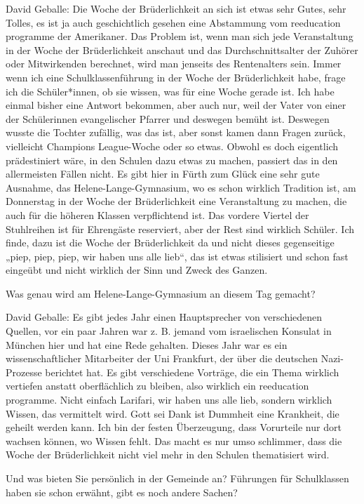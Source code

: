 David Geballe: Die Woche der Brüderlichkeit an sich ist etwas sehr Gutes, sehr Tolles, es ist ja auch geschichtlich gesehen eine Abstammung vom reeducation programme der Amerikaner. Das Problem ist, wenn man sich jede Veranstaltung in der Woche der Brüderlichkeit anschaut und das Durchschnittsalter der Zuhörer oder Mitwirkenden berechnet, wird man jenseits des Rentenalters sein. Immer wenn ich eine Schulklassenführung in der Woche der Brüderlichkeit habe, frage ich die Schüler*innen, ob sie wissen, was für eine Woche gerade ist. Ich habe einmal bisher eine Antwort bekommen, aber auch nur, weil der Vater von einer der Schülerinnen evangelischer Pfarrer und deswegen bemüht ist. Deswegen wusste die Tochter zufällig, was das ist, aber sonst kamen dann Fragen zurück, vielleicht Champions League-Woche oder so etwas. Obwohl es doch eigentlich prädestiniert wäre, in den Schulen dazu etwas zu machen, passiert das in den allermeisten Fällen nicht. Es gibt hier in Fürth zum Glück eine sehr gute Ausnahme, das Helene-Lange-Gymnasium, wo es schon wirklich Tradition ist, am Donnerstag in der Woche der Brüderlichkeit eine Veranstaltung zu machen, die auch für die höheren Klassen verpflichtend ist. Das vordere Viertel der Stuhlreihen ist für Ehrengäste reserviert, aber der Rest sind wirklich Schüler. Ich finde, dazu ist die Woche der Brüderlichkeit da und nicht dieses gegenseitige „piep, piep, piep, wir haben uns alle lieb“, das ist etwas stilisiert und schon fast eingeübt und nicht wirklich der Sinn und Zweck des Ganzen. 

Was genau wird am Helene-Lange-Gymnasium an diesem Tag gemacht? 

David Geballe: Es gibt jedes Jahr einen Hauptsprecher von verschiedenen Quellen, vor ein paar Jahren war z. B. jemand vom israelischen Konsulat in München hier und hat eine Rede gehalten. Dieses Jahr war es ein wissenschaftlicher Mitarbeiter der Uni Frankfurt, der über die deutschen Nazi-Prozesse berichtet hat. Es gibt verschiedene Vorträge, die ein Thema wirklich vertiefen anstatt oberflächlich zu bleiben, also wirklich ein reeducation programme. Nicht einfach Larifari, wir haben uns alle lieb, sondern wirklich Wissen, das vermittelt wird. Gott sei Dank ist Dummheit eine Krankheit, die geheilt werden kann. Ich bin der festen Überzeugung, dass Vorurteile nur dort wachsen können, wo Wissen fehlt. Das macht es nur umso schlimmer, dass die Woche der Brüderlichkeit nicht viel mehr in den Schulen thematisiert wird. 

Und was bieten Sie persönlich in der Gemeinde an? Führungen für Schulklassen haben sie schon erwähnt, gibt es noch andere Sachen? 

